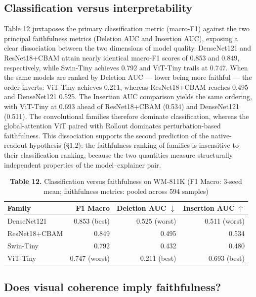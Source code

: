 \documentclass[11pt,a4paper]{article}
\begin{document}
\subsection{Classification versus interpretability}

Table 12 juxtaposes the primary classification metric (macro-F1) against the two principal faithfulness metrics (Deletion AUC and Insertion AUC), exposing a clear dissociation between the two dimensions of model quality. DenseNet121 and ResNet18+CBAM attain nearly identical macro-F1 scores of 0.853 and 0.849, respectively, while Swin-Tiny achieves 0.792 and ViT-Tiny trails at 0.747. When the same models are ranked by Deletion AUC --- lower being more faithful --- the order inverts: ViT-Tiny achieves 0.211, whereas ResNet18+CBAM reaches 0.495 and DenseNet121 0.525. The Insertion AUC comparison yields the same ordering, with ViT-Tiny at 0.693 ahead of ResNet18+CBAM (0.534) and DenseNet121 (0.511). The convolutional families therefore dominate classification, whereas the global-attention ViT paired with Rollout dominates perturbation-based faithfulness. This dissociation supports the second
prediction of the native-readout hypothesis (\S{}1.2): the faithfulness ranking of families is insensitive to their classification ranking, because the two quantities measure structurally independent properties of the model--explainer pair.

\begin{table}[htbp]
\centering
\small
\caption{\textbf{Table 12.} Classification versus faithfulness on WM-811K (F1 Macro: 3-seed mean; faithfulness metrics: pooled across 594 samples)}
\begin{tabular}{lrrr}
\toprule
Family & F1 Macro & Deletion AUC $\downarrow$ & Insertion AUC $\uparrow$ \\
\midrule
DenseNet121 & 0.853 (best) & 0.525 (worst) & 0.511 (worst) \\
ResNet18+CBAM & 0.849 & 0.495 & 0.534 \\
Swin-Tiny & 0.792 & 0.432 & 0.480 \\
ViT-Tiny & 0.747 (worst) & 0.211 (best) & 0.693 (best) \\
\bottomrule
\end{tabular}
\end{table}

\subsection{Does visual coherence imply faithfulness?}
\end{document}
